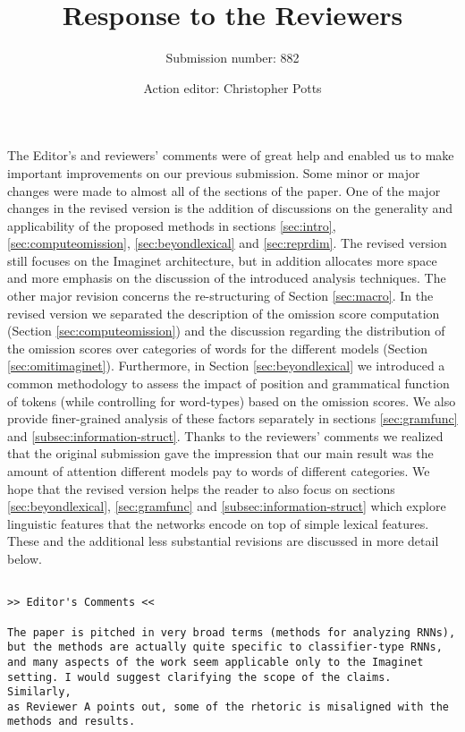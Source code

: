 \documentclass{article}
\title{Response to the Reviewers}
\author{Submission number: 882 \and
Action editor:  Christopher Potts }
\date{}
\begin{document}
\maketitle
The Editor's and reviewers' comments were of great help and enabled us
to make important improvements on our previous submission. Some minor or major
changes were made to almost all of the sections of the paper.
One of the major changes in the revised version is the addition of
discussions on the generality and applicability of the proposed
methods in sections \ref{sec:intro}, \ref{sec:computeomission}, 
\ref{sec:beyondlexical} and \ref{sec:reprdim}. The revised version
still focuses on the {\sc Imaginet} architecture, but in addition 
allocates more space and more emphasis on the discussion
of the introduced analysis techniques.
The other major revision concerns the re-structuring 
of Section \ref{sec:macro}. In the revised version we 
separated the description of the omission score computation 
(Section \ref{sec:computeomission}) and
the discussion regarding the distribution of the omission scores over 
categories of words for the different models 
(Section \ref{sec:omitimaginet}). 
Furthermore, in Section \ref{sec:beyondlexical}
we introduced a common methodology
to assess the impact of position and grammatical
function of tokens (while controlling for word-types) based on the 
omission scores. We also provide finer-grained analysis
of these factors separately in sections \ref{sec:gramfunc} and
\ref{subsec:information-struct}. Thanks to the reviewers' comments
we realized that the original submission gave the impression that our main
result was the amount of attention
different models pay to words of different categories.  We hope that the
revised version helps the reader to also focus on
sections \ref{sec:beyondlexical}, \ref{sec:gramfunc} and
\ref{subsec:information-struct} which explore linguistic features
that the networks encode on top of simple lexical features. These and
the additional less substantial revisions are discussed in more
detail below. 

\begin{verbatim}

>> Editor's Comments <<

The paper is pitched in very broad terms (methods for analyzing RNNs), 
but the methods are actually quite specific to classifier-type RNNs, 
and many aspects of the work seem applicable only to the Imaginet 
setting. I would suggest clarifying the scope of the claims. Similarly, 
as Reviewer A points out, some of the rhetoric is misaligned with the 
methods and results.  
\end{verbatim} 
\end{document}
